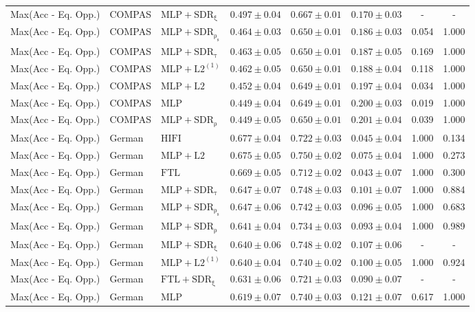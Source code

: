 \begin{table}[htbp]
\begin{tabular}{lllccccc}
Max(Acc - Eq. Opp.) & COMPAS & $\mathrm{MLP+SDR_{\xi}}$ & $0.497 \pm0.04$ & $0.667 \pm0.01$ & $0.170 \pm0.03$ & - & - \\
Max(Acc - Eq. Opp.) & COMPAS & $\mathrm{MLP+SDR_{\rho_s}}$ & $0.464 \pm0.03$ & $0.650 \pm0.01$ & $0.186 \pm0.03$ & 0.054 & 1.000 \\
Max(Acc - Eq. Opp.) & COMPAS & $\mathrm{MLP+SDR_{\tau}}$ & $0.463 \pm0.05$ & $0.650 \pm0.01$ & $0.187 \pm0.05$ & 0.169 & 1.000 \\
Max(Acc - Eq. Opp.) & COMPAS & $\mathrm{MLP+L2^{(1)}}$ & $0.462 \pm0.05$ & $0.650 \pm0.01$ & $0.188 \pm0.04$ & 0.118 & 1.000 \\
Max(Acc - Eq. Opp.) & COMPAS & $\mathrm{MLP+L2}$ & $0.452 \pm0.04$ & $0.649 \pm0.01$ & $0.197 \pm0.04$ & 0.034 & 1.000 \\
Max(Acc - Eq. Opp.) & COMPAS & $\mathrm{MLP}$ & $0.449 \pm0.04$ & $0.649 \pm0.01$ & $0.200 \pm0.03$ & 0.019 & 1.000 \\
Max(Acc - Eq. Opp.) & COMPAS & $\mathrm{MLP+SDR_{\rho}}$ & $0.449 \pm0.05$ & $0.650 \pm0.01$ & $0.201 \pm0.04$ & 0.039 & 1.000 \\
Max(Acc - Eq. Opp.) & German & $\mathrm{HIFI}$ & $0.677 \pm0.04$ & $0.722 \pm0.03$ & $0.045 \pm0.04$ & 1.000 & 0.134 \\
Max(Acc - Eq. Opp.) & German & $\mathrm{MLP+L2}$ & $0.675 \pm0.05$ & $0.750 \pm0.02$ & $0.075 \pm0.04$ & 1.000 & 0.273 \\
Max(Acc - Eq. Opp.) & German & $\mathrm{FTL}$ & $0.669 \pm0.05$ & $0.712 \pm0.02$ & $0.043 \pm0.07$ & 1.000 & 0.300 \\
Max(Acc - Eq. Opp.) & German & $\mathrm{MLP+SDR_{\tau}}$ & $0.647 \pm0.07$ & $0.748 \pm0.03$ & $0.101 \pm0.07$ & 1.000 & 0.884 \\
Max(Acc - Eq. Opp.) & German & $\mathrm{MLP+SDR_{\rho_s}}$ & $0.647 \pm0.06$ & $0.742 \pm0.03$ & $0.096 \pm0.05$ & 1.000 & 0.683 \\
Max(Acc - Eq. Opp.) & German & $\mathrm{MLP+SDR_{\rho}}$ & $0.641 \pm0.04$ & $0.734 \pm0.03$ & $0.093 \pm0.04$ & 1.000 & 0.989 \\
Max(Acc - Eq. Opp.) & German & $\mathrm{MLP+SDR_{\xi}}$ & $0.640 \pm0.06$ & $0.748 \pm0.02$ & $0.107 \pm0.06$ & - & - \\
Max(Acc - Eq. Opp.) & German & $\mathrm{MLP+L2^{(1)}}$ & $0.640 \pm0.04$ & $0.740 \pm0.02$ & $0.100 \pm0.05$ & 1.000 & 0.924 \\
Max(Acc - Eq. Opp.) & German & $\mathrm{FTL+SDR_{\xi}}$ & $0.631 \pm0.06$ & $0.721 \pm0.03$ & $0.090 \pm0.07$ & - & - \\
Max(Acc - Eq. Opp.) & German & $\mathrm{MLP}$ & $0.619 \pm0.07$ & $0.740 \pm0.03$ & $0.121 \pm0.07$ & 0.617 & 1.000 \\
\bottomrule
\end{tabular}
\end{table}